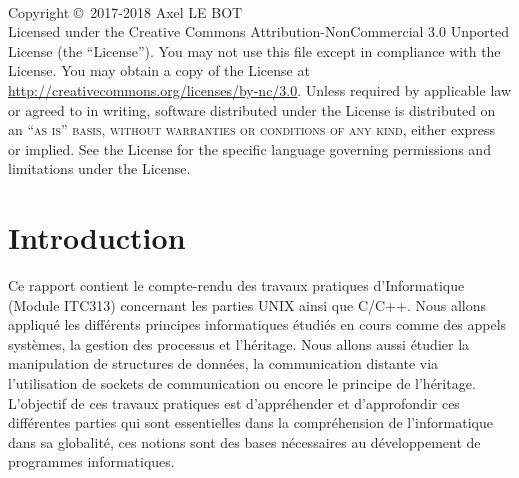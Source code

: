 \documentclass[12pt,a4paper]{book} %
\begin{document}

\newpage
~\vfill
\thispagestyle{empty}

\noindent Copyright \copyright\ 2017-2018 Axel LE BOT \\ %

\noindent Licensed under the Creative Commons Attribution-NonCommercial 3.0 Unported License (the ``License''). You may not use this file except in compliance with the License. You may obtain a copy of the License at \url{http://creativecommons.org/licenses/by-nc/3.0}. Unless required by applicable law or agreed to in writing, software distributed under the License is distributed on an \textsc{``as is'' basis, without warranties or conditions of any kind}, either express or implied. See the License for the specific language governing permissions and limitations under the License.\\ %


\pagestyle{empty} %


\chapter*{Introduction}

Ce rapport contient le compte-rendu des travaux pratiques d’Informatique (Module ITC313) concernant les parties UNIX ainsi que C/C++.
Nous allons appliqué les différents principes informatiques étudiés en cours comme des appels systèmes, la gestion des processus et l'héritage.
Nous allons aussi étudier la manipulation de structures de données, la communication distante via l’utilisation de sockets de communication ou encore le principe de l’héritage.
L’objectif de ces travaux pratiques est d’appréhender et d’approfondir ces différentes parties qui sont essentielles dans la compréhension de l’informatique dans sa globalité, ces notions sont des bases nécessaires au développement de programmes informatiques.
\end{document}
